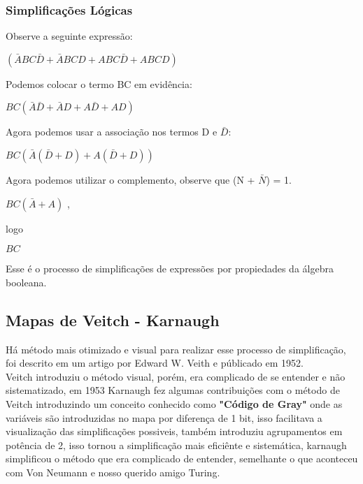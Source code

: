 \documentclass[12pt, onecolumn]{article}
\begin{document}
		\subsubsection{\centering Simplificações Lógicas}
	
	Observe a seguinte expressão: 
	\begin{center} 
		$(\bar{A} B C\bar{D} + \bar{A} B C D + A B C\bar{D} + A B C D)$  	
	\end{center}
	Podemos colocar o termo BC em evidência:
	\begin{center} 
		$BC(\bar{A}\bar{D} + \bar{A}D + A\bar{D} + AD)$
	\end{center}
	Agora podemos usar a associação nos termos D e $\bar{D}$: 
	\begin{center} 
		$BC(\bar{A}(\bar{D}  + D) + A(\bar{D} + D))$
	\end{center}
	Agora podemos utilizar o complemento, observe que (N + $\bar{N}$) = 1. \\
	\begin{center} 
		$BC(\bar{A} + A)$ ,  
	\end{center}
	logo \\
	\begin{center} 
		$BC$
	\end{center}
	Esse é o processo de simplificações de expressões por propiedades da álgebra 
	booleana. 

		\subsection{\centering Mapas de Veitch - Karnaugh}
	
	Há método mais otimizado e visual para realizar esse processo de 
	simplificação, foi descrito em um artigo por Edward W. Veith e públicado 
	em 1952. \\
	\newline
	Veitch introduziu o método visual, porém, era complicado de se entender e 
	não sistematizado, em 1953 Karnaugh fez algumas contribuições com o método 
	de Veitch introduzindo um conceito conhecido como \textbf{"Código de Gray"}
	onde as variáveis são introduzidas no mapa por diferença de 1 bit, isso
	facilitava a visualização das simplificações possiveis, também introduziu
	agrupamentos em potência de 2, isso tornou a simplificação mais eficiênte
	e sistemática, karnaugh simplificou o método que era complicado de entender,
	semelhante o que aconteceu com Von Neumann e nosso querido amigo Turing.



	
        
\end{document}
